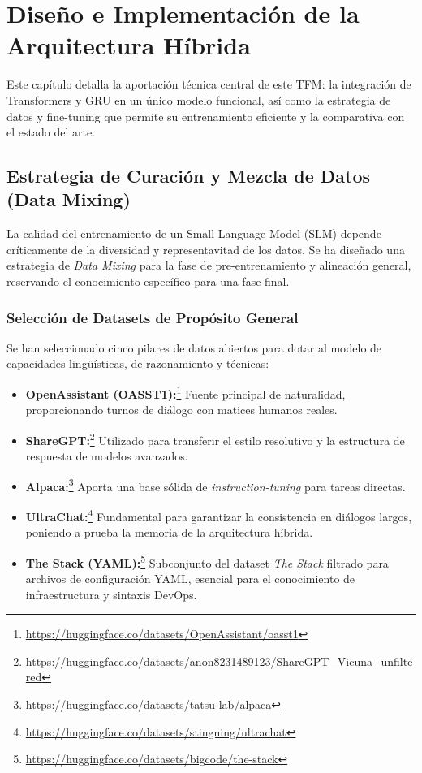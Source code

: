 \section{Diseño e Implementación de la Arquitectura Híbrida}
\label{sec:arquitectura}

Este capítulo detalla la aportación técnica central de este TFM: la integración de Transformers y GRU en un único modelo funcional, así como la estrategia de datos y fine-tuning que permite su entrenamiento eficiente y la comparativa con el estado del arte.

\subsection{Estrategia de Curación y Mezcla de Datos (Data Mixing)}
La calidad del entrenamiento de un Small Language Model (SLM) depende críticamente de la diversidad y representavitad de los datos. Se ha diseñado una estrategia de \textit{Data Mixing} para la fase de pre-entrenamiento y alineación general, reservando el conocimiento específico para una fase final.

\subsubsection{Selección de Datasets de Propósito General}
Se han seleccionado cinco pilares de datos abiertos para dotar al modelo de capacidades lingüísticas, de razonamiento y técnicas:
\begin{itemize}
    \item \textbf{OpenAssistant (OASST1):}\footnote{\url{https://huggingface.co/datasets/OpenAssistant/oasst1}} Fuente principal de naturalidad, proporcionando turnos de diálogo con matices humanos reales.
    \item \textbf{ShareGPT:}\footnote{\url{https://huggingface.co/datasets/anon8231489123/ShareGPT_Vicuna_unfiltered}} Utilizado para transferir el estilo resolutivo y la estructura de respuesta de modelos avanzados.
    \item \textbf{Alpaca:}\footnote{\url{https://huggingface.co/datasets/tatsu-lab/alpaca}} Aporta una base sólida de \textit{instruction-tuning} para tareas directas.
    \item \textbf{UltraChat:}\footnote{\url{https://huggingface.co/datasets/stingning/ultrachat}} Fundamental para garantizar la consistencia en diálogos largos, poniendo a prueba la memoria de la arquitectura híbrida.
    \item \textbf{The Stack (YAML):}\footnote{\url{https://huggingface.co/datasets/bigcode/the-stack}} Subconjunto del dataset \textit{The Stack} filtrado para archivos de configuración YAML, esencial para el conocimiento de infraestructura y sintaxis DevOps.
\end{itemize}

